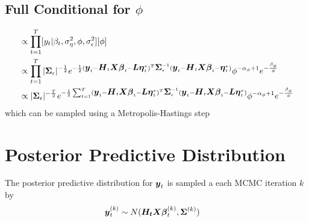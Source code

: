 \documentclass[fleqn]{article}
\def\bm#1{\mbox{\boldmath $#1$}}
\begin{document}
\subsection{Full Conditional for $\phi$}
%
\begin{align*}
  [\phi | \cdot] & \propto \prod_{t = 1}^T [y_t | \beta_t, \sigma^2_\eta, \phi, \sigma^2_\epsilon] [\phi]\\
%
& \propto \prod_{t = 1}^T | \bm{\Sigma}_\epsilon |^{ - \frac{1} {2}} e^{ - \frac{1} {2} (\bm{y}_t - \bm{H}_t \bm{X} \bm{\beta}_t - \bm{L} \bm{\eta}^*_t)^T \bm{\Sigma}_\epsilon^{ - 1} (\bm{y}_t - \bm{H}_t \bm{X} \bm{\beta}_t - \bm{\eta}^*_t)} \phi^{ - \alpha_\phi + 1} e^{ - \frac{\beta_\phi} {\phi}}\\
%
& \propto | \bm{\Sigma}_\epsilon |^{ - \frac{T} {2}} e^{ - \frac{1} {2} \sum_{t = 1}^T (\bm{y}_t - \bm{H}_t \bm{X} \bm{\beta}_t - \bm{L} \bm{\eta}^*_t)^T \bm{\Sigma}_\epsilon^{ - 1} (\bm{y}_t - \bm{H}_t \bm{X} \bm{\beta}_t - \bm{L} \bm{\eta}^*_t)} \phi^{ - \alpha_\phi + 1} e^{ - \frac{\beta_\phi} {\phi}}\\
\end{align*}
% 
which can be sampled using a Metropolis-Hastings step
%
\section{Posterior Predictive Distribution}
%
The posterior predictive distribution for $\bm{y}_t$ is sampled a each MCMC iteration $k$ by
\begin{align*}
  \bm{y}^{(k)}_t & \sim N(\bm{H_t} \bm{X} \bm{\beta}^{(k)}_t, \bm{\Sigma}^{(k)})
\end{align*}
\end{document}
